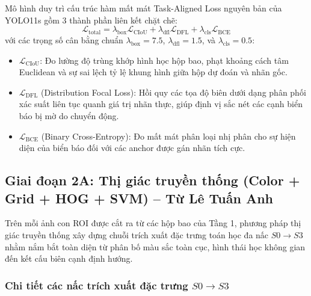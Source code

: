 \documentclass[a4paper, 11pt]{article}
\begin{document}
Mô hình duy trì cấu trúc hàm mất mát Task-Aligned Loss nguyên bản của YOLO11s gồm 3 thành phần liên kết chặt chẽ:
\begin{equation}
    \mathcal{L}_{\text{total}} = \lambda_{\text{box}} \mathcal{L}_{\text{CIoU}} + \lambda_{\text{dfl}} \mathcal{L}_{\text{DFL}} + \lambda_{\text{cls}} \mathcal{L}_{\text{BCE}}
    \label{eq:yolo_task_aligned_loss}
\end{equation}
với các trọng số cân bằng chuẩn $\lambda_{\text{box}} = 7.5$, $\lambda_{\text{dfl}} = 1.5$, và $\lambda_{\text{cls}} = 0.5$:
\begin{itemize}
    \item $\mathcal{L}_{\text{CIoU}}$: Đo lường độ trùng khớp hình học hộp bao, phạt khoảng cách tâm Euclidean và sự sai lệch tỷ lệ khung hình giữa hộp dự đoán và nhãn gốc.
    \item $\mathcal{L}_{\text{DFL}}$ (Distribution Focal Loss): Hồi quy các tọa độ biên dưới dạng phân phối xác suất liên tục quanh giá trị nhãn thực, giúp định vị sắc nét các cạnh biển báo bị mờ do chuyển động.
    \item $\mathcal{L}_{\text{BCE}}$ (Binary Cross-Entropy): Đo mất mát phân loại nhị phân cho sự hiện diện của biển báo đối với các anchor được gán nhãn tích cực.
\end{itemize}

\subsection{Giai đoạn 2A: Thị giác truyền thống (Color + Grid + HOG + SVM) -- Từ Lê Tuấn Anh}
\label{subsec:stage2_svm}

Trên mỗi ảnh con ROI được cắt ra từ các hộp bao của Tầng 1, phương pháp thị giác truyền thống xây dựng chuỗi trích xuất đặc trưng toán học đa nấc $S0 \rightarrow S3$ nhằm nắm bắt toàn diện từ phân bố màu sắc toàn cục, hình thái học không gian đến kết cấu biên cạnh định hướng.

\subsubsection{Chi tiết các nấc trích xuất đặc trưng \texorpdfstring{$S0 \rightarrow S3$}{S0 -> S3}}
\label{subsubsec:feature_steps_s0_s3}
\end{document}
